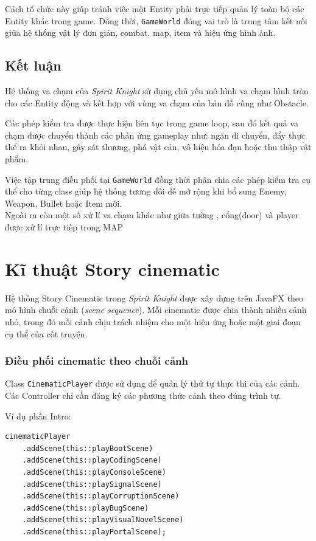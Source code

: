\documentclass[12pt,a4paper]{report}
\begin{document}
    Cách tổ chức này giúp tránh việc một Entity phải trực tiếp quản lý
    toàn bộ các Entity khác trong game. Đồng thời, \texttt{GameWorld}
    đóng vai trò là trung tâm kết nối giữa hệ thống vật lý đơn giản,
    combat, map, item và hiệu ứng hình ảnh.


    \section{Kết luận}

    Hệ thống va chạm của \textit{Spirit Knight} sử dụng chủ yếu mô hình
    va chạm hình tròn cho các Entity động và kết hợp với vùng va chạm
    của bản đồ cũng như Obstacle.

    Các phép kiểm tra được thực hiện liên tục trong game loop, sau đó
    kết quả va chạm được chuyển thành các phản ứng gameplay như:
    ngăn di chuyển, đẩy thực thể ra khỏi nhau, gây sát thương, phá vật
    cản, vô hiệu hóa đạn hoặc thu thập vật phẩm.

    Việc tập trung điều phối tại \texttt{GameWorld} đồng thời phân chia
    các phép kiểm tra cụ thể cho từng class giúp hệ thống tương đối dễ
    mở rộng khi bổ sung Enemy, Weapon, Bullet hoặc Item mới.\\
    Ngoài ra còn một số xử lí va chạm khác như giữa tường , cổng(door)
    và player được xử lí trực tiếp trong MAP


    \chapter{Kĩ thuật Story cinematic}

    Hệ thống Story Cinematic trong \textit{Spirit Knight} được xây dựng
    trên JavaFX theo mô hình chuỗi cảnh (\textit{scene sequence}).
    Mỗi cinematic được chia thành nhiều cảnh nhỏ, trong đó mỗi cảnh
    chịu trách nhiệm cho một hiệu ứng hoặc một giai đoạn cụ thể của
    cốt truyện.

    \subsection{Điều phối cinematic theo chuỗi cảnh}

    Class \texttt{CinematicPlayer} được sử dụng để quản lý thứ tự thực
    thi của các cảnh. Các Controller chỉ cần đăng ký các phương thức
    cảnh theo đúng trình tự.

    Ví dụ phần Intro:

    \begin{verbatim}
cinematicPlayer
    .addScene(this::playBootScene)
    .addScene(this::playCodingScene)
    .addScene(this::playConsoleScene)
    .addScene(this::playSignalScene)
    .addScene(this::playCorruptionScene)
    .addScene(this::playBugScene)
    .addScene(this::playVisualNovelScene)
    .addScene(this::playPortalScene);
    \end{verbatim}
\end{document}
